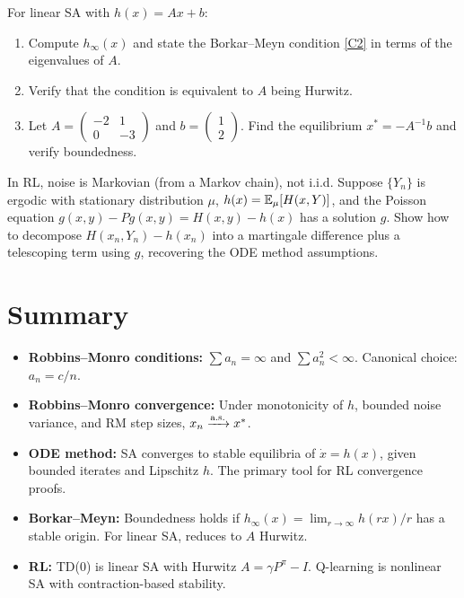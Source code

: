 \documentclass[11pt,a4paper]{article}
\begin{document}
\begin{exercise}
\label{ex:borkar-meyn-linear}
For linear SA with $h(x) = Ax + b$:
\begin{enumerate}[label=(\alph*)]
  \item Compute $h_\infty(x)$ and state the Borkar--Meyn condition
    \ref{C2} in terms of the eigenvalues of $A$.
  \item Verify that the condition is equivalent to $A$ being Hurwitz.
  \item Let
    $A = \begin{pmatrix} -2 & 1 \\ 0 & -3 \end{pmatrix}$
    and $b = \begin{pmatrix} 1 \\ 2 \end{pmatrix}$.
    Find the equilibrium $x^* = -A^{-1}b$ and verify boundedness.
\end{enumerate}
\end{exercise}

\begin{exercise}
\label{ex:markov-noise}
In RL, noise is Markovian (from a Markov chain), not i.i.d. Suppose
$\{Y_n\}$ is ergodic with stationary distribution $\mu$,
$h(x) = \mathbb{E}_\mu[H(x,Y)]$, and the Poisson equation
$g(x,y) - Pg(x,y) = H(x,y) - h(x)$ has a solution $g$.
Show how to decompose $H(x_n,Y_n) - h(x_n)$ into a martingale
difference plus a telescoping term using $g$, recovering the ODE
method assumptions.
\end{exercise}


\section{Summary}
\label{sec:summary}

\begin{itemize}[leftmargin=2em]
  \item \textbf{Robbins--Monro conditions:} $\sum a_n = \infty$ and
    $\sum a_n^2 < \infty$. Canonical choice: $a_n = c/n$.
  \item \textbf{Robbins--Monro convergence:} Under monotonicity of
    $h$, bounded noise variance, and RM step sizes, $x_n \xrightarrow{\text{a.s.}} x^*$.
  \item \textbf{ODE method:} SA converges to stable equilibria of
    $\dot{x} = h(x)$, given bounded iterates and Lipschitz $h$.
    The primary tool for RL convergence proofs.
  \item \textbf{Borkar--Meyn:} Boundedness holds if
    $h_\infty(x) = \lim_{r \to \infty} h(rx)/r$ has a stable origin.
    For linear SA, reduces to $A$ Hurwitz.
  \item \textbf{RL:} TD(0) is linear SA with Hurwitz $A = \gamma P^\pi - I$.
    Q-learning is nonlinear SA with contraction-based stability.
\end{itemize}
\end{document}
